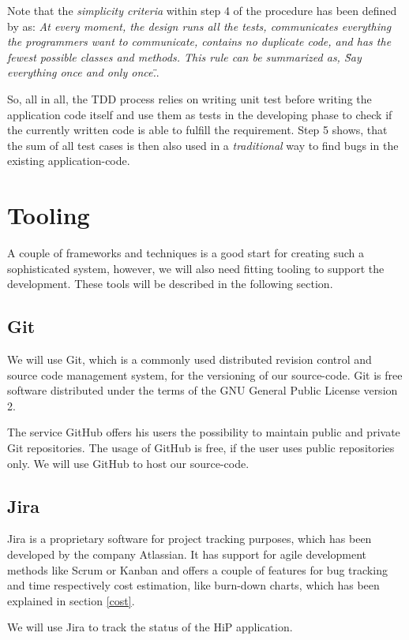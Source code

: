 Note that the \textit{simplicity criteria} within step 4 of the procedure has been defined by \cite{Beck1999} as: \textit{At every moment, the design runs all the tests, communicates everything the programmers want to communicate, contains no duplicate code, and has the fewest possible classes and methods. This rule can be summarized as, \"Say everything once and only once.\"}. 

So, all in all, the \ac{TDD} process relies on writing unit test before writing the application code itself and use them as tests in the developing phase to check if the currently written code is able to fulfill the requirement. Step 5 shows, that the sum of all test cases is then also used in a \textit{traditional} way to find bugs in the existing application-code. 

\section{Tooling}
A couple of frameworks and techniques is a good start for creating such a sophisticated system, however, we will also need fitting tooling to support the development. These tools will be described in the following section.

\subsection{Git}
We will use Git, which is a commonly used distributed revision control and source code management system, for the versioning of our source-code. Git is free software distributed under the terms of the GNU General Public License version 2.

The service GitHub offers his users the possibility to maintain public and private Git repositories. The usage of GitHub is free, if the user uses public repositories only. We will use GitHub to host our source-code.

\subsection{Jira}
Jira is a proprietary software for project tracking purposes, which has been developed by the company Atlassian. It has support for agile development methods like Scrum or Kanban and offers a couple of features for bug tracking and time respectively cost estimation, like burn-down charts, which has been explained in section \ref{cost}. 

We will use Jira to track the status of the \ac{HiP} application.


